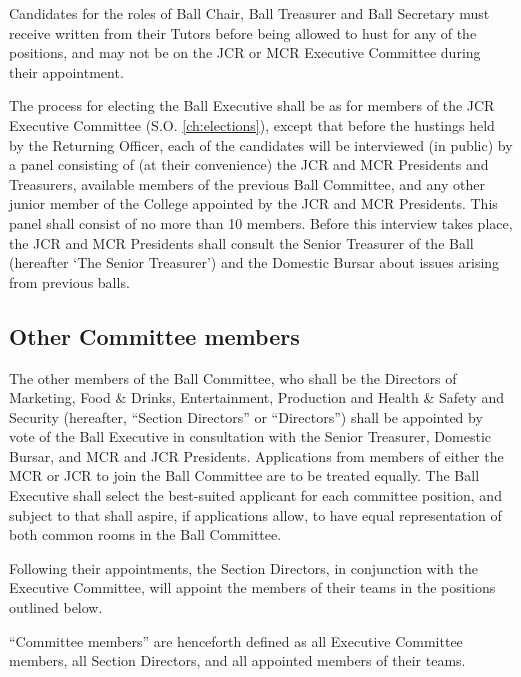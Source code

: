 \appnpara Candidates for the roles of Ball Chair, Ball Treasurer and Ball Secretary must receive written from their Tutors before being allowed to hust for any of the positions, and may not be on the JCR or MCR Executive Committee during their appointment.

\appnpara The process for electing the Ball Executive shall be as for members of the JCR Executive Committee (S.O. \ref{ch:elections}), except that before the hustings held by the Returning Officer, each of the candidates will be interviewed (in public) by a panel consisting of (at their convenience) the JCR and MCR Presidents and Treasurers, available members of the previous Ball Committee, and any other junior member of the College appointed by the JCR and MCR Presidents.  This panel shall consist of no more than 10 members.  Before this interview takes place, the JCR and MCR Presidents shall consult the Senior Treasurer of the Ball (hereafter ‘The Senior Treasurer’) and the Domestic Bursar about issues arising from previous balls.  

\subsection{Other Committee members}

\appnpara The other members of the Ball Committee, who shall be the Directors of Marketing, Food \& Drinks, Entertainment, Production and Health \& Safety and Security (hereafter, ``Section Directors'' or ``Directors'') shall be appointed by vote of the Ball Executive in consultation with the Senior Treasurer, Domestic Bursar, and MCR and JCR Presidents.  Applications from members of either the MCR or JCR to join the Ball Committee are to be treated equally.  The Ball Executive shall select the best-suited applicant for each committee position, and subject to that shall aspire, if applications allow, to have equal representation of both common rooms in the Ball Committee.

\appnpara Following their appointments, the Section Directors, in conjunction with the Executive Committee, will appoint the members of their teams in the positions outlined below. 

\appnpara ``Committee members'' are henceforth defined as all Executive Committee members, all Section Directors, and all appointed members of their teams.

